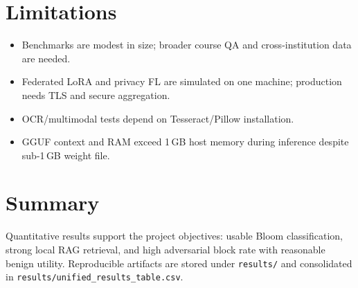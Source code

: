 \section{Limitations}
\begin{itemize}
    \item Benchmarks are modest in size; broader course QA and cross-institution data are needed.
    \item Federated LoRA and privacy FL are simulated on one machine; production needs TLS and secure aggregation.
    \item OCR/multimodal tests depend on Tesseract/Pillow installation.
    \item GGUF context and RAM exceed 1\,GB host memory during inference despite sub-1\,GB weight file.
\end{itemize}

\section{Summary}
Quantitative results support the project objectives: usable Bloom classification, strong local RAG retrieval, and high adversarial block rate with reasonable benign utility. Reproducible artifacts are stored under \texttt{results/} and consolidated in \texttt{results/unified\_results\_table.csv}.
